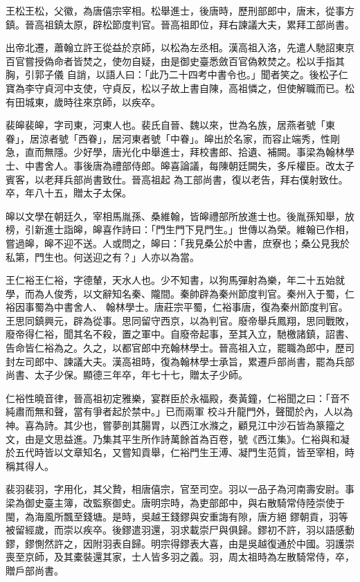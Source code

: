 \begin{pinyinscope}
 王松王松，父徽，為唐僖宗宰相。松舉進士，後唐時，歷刑部郎中，唐末，從事方鎮。晉高祖鎮太原，辟松節度判官。晉高祖即位，拜右諫議大夫，累拜工部尚書。



 出帝北遷，蕭翰立許王從益於京師，以松為左丞相。漢高祖入洛，先遣人馳詔東京百官嘗授偽命者皆焚之，使勿自疑，由是御史臺悉斂百官偽敕焚之。松以手指其胸，引郭子儀
 自誚，以語人曰：「此乃二十四考中書令也。」聞者笑之。後松子仁寶為李守貞河中支使，守貞反，松以子故上書自陳，高祖憐之，但使解職而已。松有田城東，歲時往來京師，以疾卒。



 裴皞裴皞，字司東，河東人也。裴氏自晉、魏以來，世為名族，居燕者號「東眷」，居涼者號「西眷」，居河東者號「中眷」。皞出於名家，而容止端秀，性剛急，直而無隱。少好學，唐光化中舉進士，拜校書郎、拾遺、補闕。事梁為翰林學士、中書舍人。事後唐為禮部侍郎。皞喜論議，每陳朝廷闕失，多斥權臣。改太子賓客，以老拜兵部尚書致仕。晉高祖起
 為工部尚書，復以老告，拜右僕射致仕。卒，年八十五，贈太子太保。



 皞以文學在朝廷久，宰相馬胤孫、桑維翰，皆皞禮部所放進士也。後胤孫知舉，放榜，引新進士詣皞，皞喜作詩曰：「門生門下見門生。」世傳以為榮。維翰已作相，嘗過皞，皞不迎不送。人或問之，皞曰：「我見桑公於中書，庶寮也；桑公見我於私第，門生也。何送迎之有？」人亦以為當。



 王仁裕王仁裕，字德輦，天水人也。少不知書，以狗馬彈射為樂，年二十五始就學，而為人俊秀，以文辭知名秦、隴間。秦帥辟為秦州節度判官。秦州入于蜀，仁裕因事蜀為中書舍人、
 翰林學士。唐莊宗平蜀，仁裕事唐，復為秦州節度判官。王思同鎮興元，辟為從事。思同留守西京，以為判官。廢帝舉兵鳳翔，思同戰敗，廢帝得仁裕，聞其名不殺，置之軍中。自廢帝起事，至其入立，馳檄諸鎮，詔書、告命皆仁裕為之。久之，以都官郎中充翰林學士。晉高祖入立，罷職為郎中，歷司封左司郎中、諫議大夫。漢高祖時，復為翰林學士承旨，累遷戶部尚書，罷為兵部尚書、太子少保。顯德三年卒，年七十七，贈太子少師。



 仁裕性曉音律，晉高祖初定雅樂，宴群臣於永福殿，奏黃鐘，仁裕聞之曰：「音不純肅而無和聲，當有爭者起於禁中。」已而兩軍
 校斗升龍門外，聲聞於內，人以為神。喜為詩。其少也，嘗夢剖其腸胃，以西江水滌之，顧見江中沙石皆為篆籀之文，由是文思益進。乃集其平生所作詩萬餘首為百卷，號《西江集》。仁裕與和凝於五代時皆以文章知名，又嘗知貢舉，仁裕門生王溥、凝門生范質，皆至宰相，時稱其得人。



 裴羽裴羽，字用化，其父贄，相唐僖宗，官至司空。羽以一品子為河南壽安尉。事梁為御史臺主簿，改監察御史。唐明宗時，為吏部郎中，與右散騎常侍陸崇使于閩，為海風所飄至錢塘。是時，吳越王錢鏐與安重誨有隙，唐方絕
 鏐朝貢，羽等被留經歲，而崇以疾卒。後鏐遣羽還，羽求載崇尸與俱歸。鏐初不許，羽以語感動鏐，鏐惻然許之，因附羽表自歸。明宗得鏐表大喜，由是吳越復通於中國。羽護崇喪至京師，及其橐裝還其家，士人皆多羽之義。羽，周太祖時為左散騎常侍，卒，贈戶部尚書。




\end{pinyinscope}
